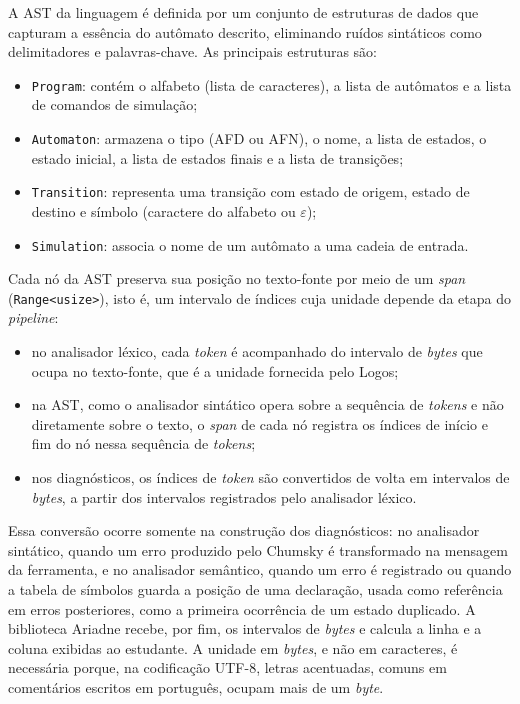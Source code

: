\documentclass[
    12pt
    ,oneside
    ,a4paper
    ,chapter=TITLE
    ,section=TITLE
    ,sumario=abnt-6027-2012]{abntex2}
\begin{document}
A AST da linguagem é definida por um conjunto de estruturas de dados que capturam a
essência do autômato descrito, eliminando ruídos sintáticos como delimitadores e
palavras-chave. As principais estruturas são:

\begin{itemize}
    \item \texttt{Program}: contém o alfabeto (lista de caracteres), a lista de
          autômatos e a lista de comandos de simulação;
    \item \texttt{Automaton}: armazena o tipo (AFD ou AFN), o nome, a lista de estados,
          o estado inicial, a lista de estados finais e a lista de transições;
    \item \texttt{Transition}: representa uma transição com estado de origem, estado de
          destino e símbolo (caractere do alfabeto ou $\varepsilon$);
    \item \texttt{Simulation}: associa o nome de um autômato a uma cadeia de entrada.
\end{itemize}

Cada nó da AST preserva sua posição no texto-fonte por meio de um \textit{span}
(\texttt{Range<usize>}), isto é, um intervalo de índices cuja unidade depende da etapa
do \textit{pipeline}:

\begin{itemize}
    \item no analisador léxico, cada \textit{token} é acompanhado do intervalo de
          \textit{bytes} que ocupa no texto-fonte, que é a unidade fornecida pelo Logos;
    \item na AST, como o analisador sintático opera sobre a sequência de \textit{tokens}
          e não diretamente sobre o texto, o \textit{span} de cada nó registra os índices
          de início e fim do nó nessa sequência de \textit{tokens};
    \item nos diagnósticos, os índices de \textit{token} são convertidos de volta em
          intervalos de \textit{bytes}, a partir dos intervalos registrados pelo
          analisador léxico.
\end{itemize}

Essa conversão ocorre somente na construção dos diagnósticos: no analisador sintático,
quando um erro produzido pelo Chumsky é transformado na mensagem da ferramenta, e no
analisador semântico, quando um erro é registrado ou quando a tabela de símbolos guarda a
posição de uma declaração, usada como referência em erros posteriores, como a primeira
ocorrência de um estado duplicado. A biblioteca Ariadne recebe, por fim, os intervalos de
\textit{bytes} e calcula a linha e a coluna exibidas ao estudante. A unidade em
\textit{bytes}, e não em caracteres, é necessária porque, na codificação UTF-8, letras
acentuadas, comuns em comentários escritos em português, ocupam mais de um \textit{byte}.
\end{document}
